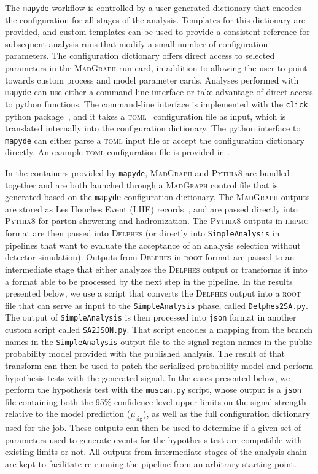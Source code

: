 \documentclass{article}
\newcommand{\mapyde}{\texttt{mapyde}}
\newcommand{\simpleanalysis}{\texttt{SimpleAnalysis}}
\newcommand{\madgraph}{\textsc{MadGraph}}
\newcommand{\pythia}{\textsc{Pythia8}}
\newcommand{\delphes}{\textsc{Delphes}}
\newcommand{\musig}{\ensuremath{\mu_{\mathrm{sig}}}}
\newcommand{\hepmc}{\textsc{hepmc}}
\newcommand{\ROOT}{\textsc{root}}
\newcommand{\json}{\texttt{json}}
\newcommand{\toml}{\textsc{toml}}
\begin{document}
The \mapyde{} workflow is controlled by a user-generated dictionary that encodes the configuration for all stages of the analysis.  Templates for this dictionary are provided, and custom templates can be used to provide a consistent reference for subsequent analysis runs that modify a small number of configuration parameters.  The configuration dictionary offers direct access to selected parameters in the \madgraph{} run card, in addition to allowing the user to point towards custom process and model parameter cards.  Analyses performed with \mapyde{} can use either a command-line interface or take advantage of direct access to python functions.  The command-line interface is implemented with the \texttt{click} python package~\cite{click}, and it takes a \toml{}~\cite{toml} configuration file as input, which is translated internally into the configuration dictionary.  The python interface to \mapyde{} can either parse a \toml{} input file or accept the configuration dictionary directly.  An example \toml{} configuration file is provided in .

In the containers provided by \mapyde, \madgraph{} and \pythia{} are bundled together and are both launched through a \madgraph{} control file that is generated based on the \mapyde{} configuration dictionary.  The \madgraph{} outputs are stored as Les Houches Event (LHE) records~\cite{Alwall:2006yp}, and are passed directly into \pythia{} for parton showering and hadronization.  The \pythia{} outputs in \hepmc{} format are then passed into \delphes{} (or directly into \simpleanalysis{} in pipelines that want to evaluate the acceptance of an analysis selection without detector simulation).  Outputs from \delphes{} in \ROOT{} format are passed to an intermediate stage that either analyzes the \delphes{} output or transforms it into a format able to be processed by the next step in the pipeline.  In the results presented below, we use a script that converts the \delphes{} output into a \ROOT{} file that can serve as input to the \simpleanalysis{} phase, called \texttt{Delphes2SA.py}.  The output of \simpleanalysis{} is then processed into \json{} format in another custom script called \texttt{SA2JSON.py}.  That script encodes a mapping from the branch names in the \simpleanalysis{} output file to the signal region names in the public probability model provided with the published analysis.  The result of that transform can then be used to patch the serialized probability model and perform hypothesis tests with the generated signal.  In the cases presented below, we perform the hypothesis test with the \texttt{muscan.py} script, whose output is a \json{} file containing both the 95\% confidence level upper limits on the signal strength relative to the model prediction (\musig), as well as the full configuration dictionary used for the job.  These outputs can then be used to determine if a given set of parameters used to generate events for the hypothesis test are compatible with existing limits or not.  All outputs from intermediate stages of the analysis chain are kept to facilitate re-running the pipeline from an arbitrary starting point.
\end{document}
